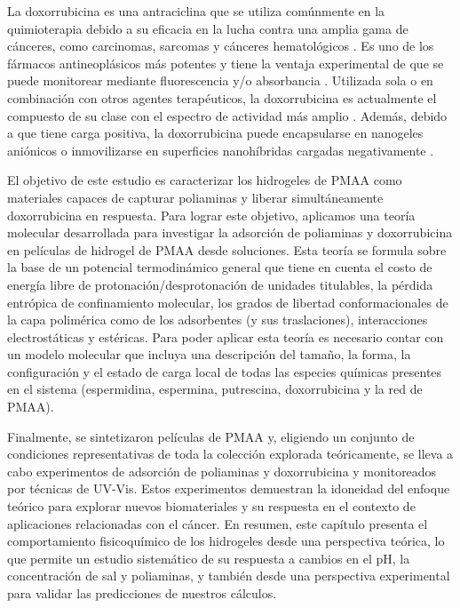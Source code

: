 La doxorrubicina es una antraciclina que se utiliza com\'unmente en la quimioterapia debido a su eficacia en la lucha contra una amplia gama de c\'anceres, como carcinomas, sarcomas y c\'anceres hematol\'ogicos \cite{Panis2012}.
Es uno de los f\'armacos antineopl\'asicos m\'as potentes y tiene la ventaja experimental de que se puede monitorear mediante fluorescencia y/o absorbancia  \cite{Serpe2005}.
Utilizada sola o en combinaci\'on con otros agentes terap\'euticos, la doxorrubicina es actualmente el compuesto de su clase con el espectro de actividad m\'as amplio  \cite{Carvalho2009}.
Adem\'as, debido a que tiene carga positiva, la doxorrubicina puede encapsularse en nanogeles ani\'onicos \cite{Li2019} o inmovilizarse en superficies nanoh\'ibridas cargadas negativamente \cite{kazempour2019}.

El objetivo de este estudio es caracterizar los hidrogeles de PMAA como materiales capaces de capturar poliaminas y liberar simult\'aneamente doxorrubicina en respuesta.
Para lograr este objetivo, aplicamos una teor\'ia molecular desarrollada para investigar la adsorci\'on de poliaminas y doxorrubicina en pel\'iculas de hidrogel de PMAA desde soluciones.
Esta teor\'ia se formula sobre la base de un potencial termodin\'amico general que tiene en cuenta el costo de energ\'ia libre de protonaci\'on/desprotonaci\'on de unidades titulables, la p\'erdida entr\'opica de confinamiento molecular, los grados de libertad conformacionales de la capa polim\'erica como de los adsorbentes (y sus traslaciones),  interacciones electrost\'aticas y est\'ericas.
Para poder aplicar esta teor\'ia es necesario contar con un modelo molecular que incluya una descripci\'on del tama\~no, la forma, la configuraci\'on y el estado de carga local de todas las especies qu\'imicas presentes en el sistema (espermidina, espermina, putrescina, doxorrubicina y la red de PMAA).

Finalmente, se sintetizaron pel\'iculas de PMAA y, eligiendo un conjunto de condiciones representativas de toda la colecci\'on explorada te\'oricamente, se lleva  a cabo experimentos de adsorci\'on de poliaminas y doxorrubicina y monitoreados por t\'ecnicas de UV-Vis.
Estos experimentos demuestran la idoneidad del enfoque te\'orico para explorar nuevos biomateriales y su respuesta en el contexto de aplicaciones relacionadas con el c\'ancer.
En resumen, este cap\'itulo presenta el comportamiento fisicoqu\'imico de los hidrogeles desde una perspectiva te\'orica, lo que permite un estudio sistem\'atico de su respuesta a cambios en el pH, la concentraci\'on de sal y poliaminas, y tambi\'en desde una perspectiva experimental para validar las predicciones de nuestros c\'alculos.


